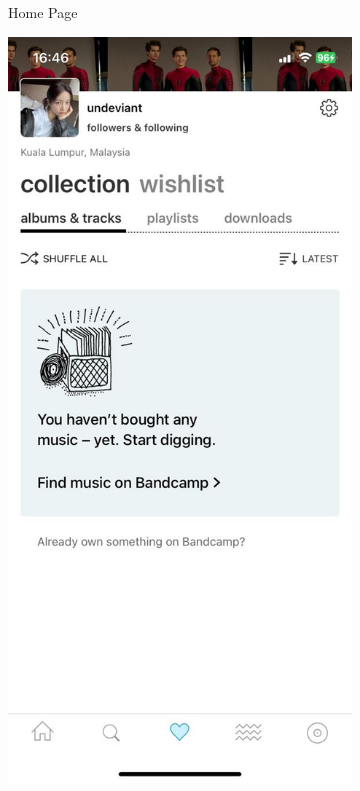 \begin{figure} [h]
\begin{subfigure}{.3\linewidth}
      \caption{Home Page}
      \label{fig:myfig23}
    \end{subfigure}%
    \hspace{1em}%
    \begin{subfigure}{.3\linewidth}
      \centering
      \includegraphics[width = \linewidth]{mainmatter/images/bandcamp2.jpg}

\end{subfigure}
\end{figure}
